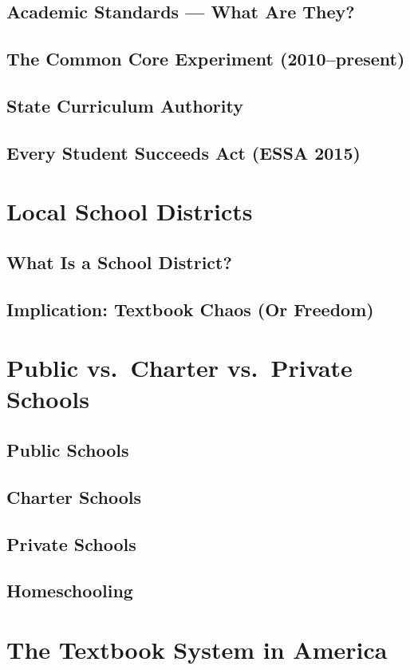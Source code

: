\subsection{Academic Standards --- What Are They?}
\subsection{The Common Core Experiment (2010--present)}
\subsection{State Curriculum Authority}
\subsection{Every Student Succeeds Act (ESSA 2015)}

\section{Local School Districts}
\subsection{What Is a School District?}
\subsection{Implication: Textbook Chaos (Or Freedom)}

\section{Public vs.\ Charter vs.\ Private Schools}
\subsection{Public Schools}
\subsection{Charter Schools}
\subsection{Private Schools}
\subsection{Homeschooling}

\section{The Textbook System in America}
